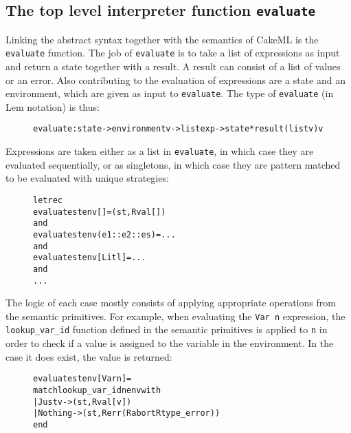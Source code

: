 
\subsection{The top level interpreter function \texttt{evaluate}}
Linking the abstract syntax together with the semantics of CakeML is the
\texttt{evaluate} function. The job of \texttt{evaluate} is to take a list of
expressions as input and return a state together with a result. A result can
consist of a list of values or an error. Also contributing to the evaluation
of expressions are a state and an environment, which are given as input to
\texttt{evaluate}. The type of \texttt{evaluate} (in Lem notation) is thus:

\begin{figure}[H]
\begin{alltt}
  evaluate:state -> environment v -> list exp -> state*result (list v) v
\end{alltt}
\end{figure}

\noindent Expressions are taken either as a list in \texttt{evaluate},
in which case they are evaluated sequentially, or as singletons, in which case
they are pattern matched to be evaluated with unique strategies:

\begin{figure}[H]
\begin{alltt}
  let rec
  evaluate st env []           = (st, Rval [])
  and
  evaluate st env (e1::e2::es) = ...
  and
  evaluate st env [Lit l]      = ...
  and
  ...
\end{alltt}
\end{figure}

\noindent The logic of each case mostly consists of applying appropriate
operations from the semantic primitives. For example, when evaluating
the \texttt{Var n} expression, the \texttt{lookup\_var\_id} function defined
in the semantic primitives is applied to \texttt{n} in order to check if
a value is assigned to the variable in the environment. In the case it does
exist, the value is returned:

\begin{figure}[H]
\begin{alltt}
  evaluate st env [Var n] =
    match lookup_var_id n env with
    | Just v -> (st, Rval [v])
    | Nothing -> (st, Rerr (Rabort Rtype_error))
    end
\end{alltt}
\end{figure}

